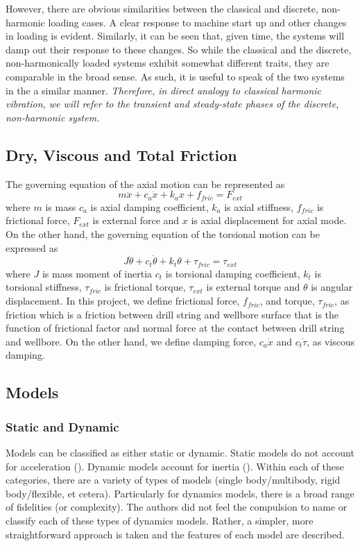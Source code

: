 However, there are obvious similarities between the classical and discrete, non-harmonic loading cases.  A clear response to machine start up and other changes in loading is evident.  Similarly, it can be seen that, given time, the systems will damp out their response to these changes.  So while the classical and the discrete, non-harmonically loaded systems exhibit somewhat different traits, they are comparable in the broad sense.  As such, it is useful to speak of the two systems in the a similar manner.  \emph{Therefore, in direct analogy to classical harmonic vibration, we will refer to the transient and steady-state phases of the discrete, non-harmonic system.}

\subsection{Dry, Viscous and Total Friction}
The governing equation of the axial motion can be represented as 
\begin{equation}\label{eq:axial_motion_GE}
    m\ddot{x} + c_a\dot{x} + k_a{x} + f_{fric} = F_{ext}
\end{equation}
where $m$ is mass $c_a$ is axial damping coefficient, $k_a$ is axial stiffness, $f_{fric}$ is frictional force, $F_{ext}$ is external force and $x$ is axial displacement  for axial mode. On the other hand, the governing equation of the torsional motion can be expressed as
\begin{equation}\label{eq:torsional_motion_GE}
    J\ddot{\theta} + c_t\dot{\theta} + k_t\theta + \tau _{fric} = \tau _{ext}
\end{equation}
where $J$ is mass moment of inertia $c_t$ is torsional damping coefficient, $k_t$ is torsional stiffness, $\tau _{fric}$ is frictional torque, $\tau _{ext}$ is external torque and $\theta$ is angular displacement. In this project, we define frictional force, $f_{fric}$, and torque, $\tau _{fric}$, as friction which is a friction between drill string and wellbore surface that is the function of frictional factor and normal force at the contact between drill string and wellbore. On the other hand, we define damping force, $c_a\dot{x}$ and $c_t\dot{\tau}$, as viscous damping.

\subsection{Models}
\subsubsection{Static and Dynamic}
Models can be classified as either static or dynamic.  Static models do not account for acceleration (\staticforcebalance{}).  Dynamic models account for inertia (\dynamicforcebalance{}).  Within each of these categories, there are a variety of types of models (single body/multibody, rigid body/flexible, et cetera).  Particularly for dynamics models, there is a broad range of fidelities (or complexity).  The authors did not feel the compulsion to name or classify each of these types of dynamics models.  Rather, a simpler, more straightforward approach is taken and the features of each model are described.

